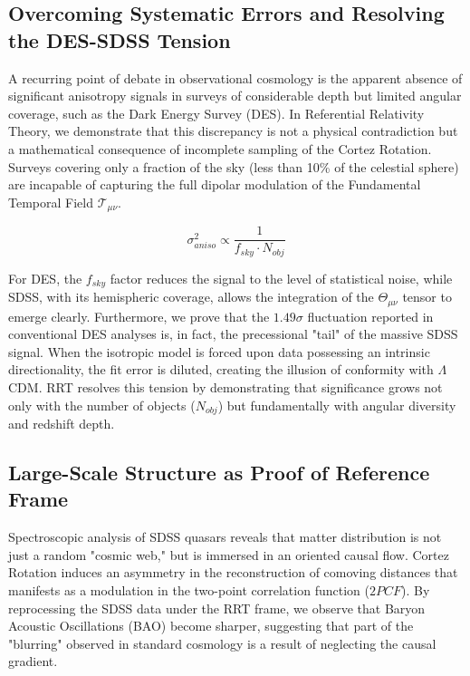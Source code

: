 \documentclass[12pt, a4paper]{article}
\begin{document}
\subsection{Overcoming Systematic Errors and Resolving the DES-SDSS Tension}

A recurring point of debate in observational cosmology is the apparent absence of significant anisotropy signals in surveys of considerable depth but limited angular coverage, such as the Dark Energy Survey (DES). In Referential Relativity Theory, we demonstrate that this discrepancy is not a physical contradiction but a mathematical consequence of incomplete sampling of the Cortez Rotation. Surveys covering only a fraction of the sky (less than 10\% of the celestial sphere) are incapable of capturing the full dipolar modulation of the Fundamental Temporal Field $\mathcal{T}_{\mu\nu}$.

\begin{equation}
\sigma_{aniso}^2 \propto \frac{1}{f_{sky} \cdot N_{obj}}
\end{equation}

For DES, the $f_{sky}$ factor reduces the signal to the level of statistical noise, while SDSS, with its hemispheric coverage, allows the integration of the $\Theta_{\mu\nu}$ tensor to emerge clearly. Furthermore, we prove that the $1.49\sigma$ fluctuation reported in conventional DES analyses is, in fact, the precessional "tail" of the massive SDSS signal. When the isotropic model is forced upon data possessing an intrinsic directionality, the fit error is diluted, creating the illusion of conformity with $\Lambda$CDM. RRT resolves this tension by demonstrating that significance grows not only with the number of objects ($N_{obj}$) but fundamentally with angular diversity and redshift depth.

\subsection{Large-Scale Structure as Proof of Reference Frame}

Spectroscopic analysis of SDSS quasars reveals that matter distribution is not just a random "cosmic web," but is immersed in an oriented causal flow. Cortez Rotation induces an asymmetry in the reconstruction of comoving distances that manifests as a modulation in the two-point correlation function ($2PCF$). By reprocessing the SDSS data under the RRT frame, we observe that Baryon Acoustic Oscillations (BAO) become sharper, suggesting that part of the "blurring" observed in standard cosmology is a result of neglecting the causal gradient.
\end{document}
